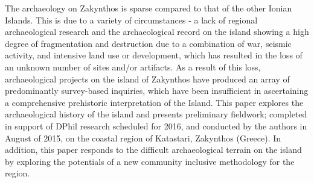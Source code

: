 \vspace{3em}
\midarticle
\label{Takkou:firstpage}
\begin{myabstract}
The archaeology on Zakynthos is sparse compared to that of the other Ionian Islands. This is due to a variety of circumstances - a lack of regional archaeological research and the archaeological record on the island showing a high degree of fragmentation and destruction due to a combination of war, seismic activity, and intensive land use or development, which has resulted in the loss of an unknown number of sites and/or artifacts. As a result of this loss, archaeological projects on the island of Zakynthos have produced an array of predominantly survey-based inquiries, which have been insufficient in ascertaining a comprehensive prehistoric interpretation of the Island. This paper explores the archaeological history of the island and presents preliminary fieldwork; completed in support of DPhil research scheduled for 2016, and conducted by the authors in August of 2015, on the coastal region of Katastari, Zakynthos (Greece). In addition, this paper responds to the difficult archaeological terrain on the island by exploring the potentials of a new community inclusive methodology for the region. 
	
\end{myabstract}
	
	
